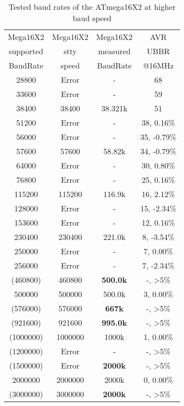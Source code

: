 \begin{table}[H]
  \begin{center}
    \begin{tabular}{| c | c | c || c |}
    \hline
    Mega16X2  & Mega16X2 & Mega16X2   & AVR \\
    supported  & stty  & measured  & UBBR  \\
    BaudRate   & speed & BaudRate  & @16MHz \\
    \hline
    \hline
    \hline
      28800  &  Error   &   -       &    68 \\
    \hline
      33600  &  Error   &   -       &    59  \\
    \hline
      38400  &  38400   &  38.321k  &    51  \\
    \hline
      51200  &  Error   &   -       &    38,  0.16\%  \\
    \hline
      56000  &  Error   &   -       &    35, -0.79\%  \\
    \hline
      57600  &  57600   &  58.82k    &    34, -0.79\%  \\
    \hline
      64000  &  Error   &   -       &    30,  0.80\%  \\
    \hline
      76800  &  Error   &   -       &    25, 0.16\%  \\
    \hline
     115200  &  115200  &  116.9k   &    16, 2.12\%  \\
    \hline
     128000  &  Error   &   -       &    15, -2.34\%  \\
    \hline
     153600  &  Error   &   -       &    12, 0.16\%  \\
    \hline
     230400  &  230400  &  221.0k   &    8, -3.54\%  \\
    \hline
     250000  &  Error   &   -       &    7, 0.00\%  \\
    \hline
     256000  &  Error   &   -       &    7, -2.34\%  \\
    \hline
    (460800) &  460800  & \bf{500.0k} &    -, >5\%  \\
    \hline
     500000  &  500000  &  500.0k   &    3, 0.00\%  \\
    \hline
    (576000)  & 576000 & \bf{667k}  &    -, >5\%  \\
    \hline
    (921600) &  921600  & \bf{995.0k} &    -, >5\%  \\
    \hline
   (1000000) & 1000000 &   1000k    &    1, 0.00\%  \\
    \hline
   (1200000) &  Error   &   -        &   -, >5\%  \\
    \hline
   (1500000) & Error  & \bf{2000k} &   -, >5\%  \\
    \hline
    2000000  & 2000000 &   2000k   & 0, 0.00\%  \\
    \hline
   (3000000) & 3000000 & \bf{2000k} &   -, >5\%   \\
    \hline
    \end{tabular}
  \end{center}
  \caption{Tested baud rates of the ATmega16X2 at higher baud speed}
  \label{tab:mega16xbaudh}
\end{table}

